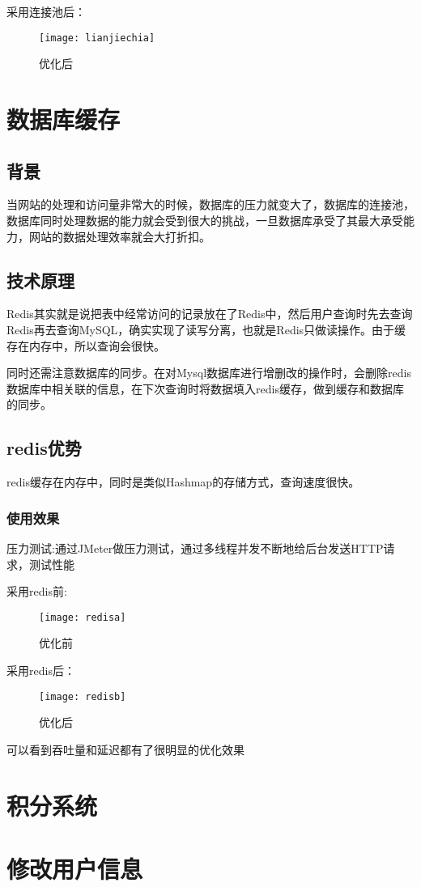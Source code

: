  
采用连接池后：
\begin{figure}[htbp]
	\centering
	\texttt{[image: lianjiechia]}
	\caption{优化后}
	\vspace{\baselineskip}
\end{figure}
\section{数据库缓存}
\subsection{背景}

当网站的处理和访问量非常大的时候，数据库的压力就变大了，数据库的连接池，数据库同时处理数据的能力就会受到很大的挑战，一旦数据库承受了其最大承受能力，网站的数据处理效率就会大打折扣。

\subsection{技术原理}
Redis其实就是说把表中经常访问的记录放在了Redis中，然后用户查询时先去查询Redis再去查询MySQL，确实实现了读写分离，也就是Redis只做读操作。由于缓存在内存中，所以查询会很快。

同时还需注意数据库的同步。在对Mysql数据库进行增删改的操作时，会删除redis数据库中相关联的信息，在下次查询时将数据填入redis缓存，做到缓存和数据库的同步。

\subsection{redis优势}
redis缓存在内存中，同时是类似Hashmap的存储方式，查询速度很快。

\subsubsection{使用效果}

压力测试:通过JMeter做压力测试，通过多线程并发不断地给后台发送HTTP请求，测试性能

采用redis前:
\begin{figure}[htbp]
	\centering
	\texttt{[image: redisa]}
	\caption{优化前}
	\vspace{\baselineskip}
\end{figure}


采用redis后：
\begin{figure}[htbp]
	\centering
	\texttt{[image: redisb]}
	\caption{优化后}
	\vspace{\baselineskip}
\end{figure}

可以看到吞吐量和延迟都有了很明显的优化效果
\section{积分系统}

\section{修改用户信息}

